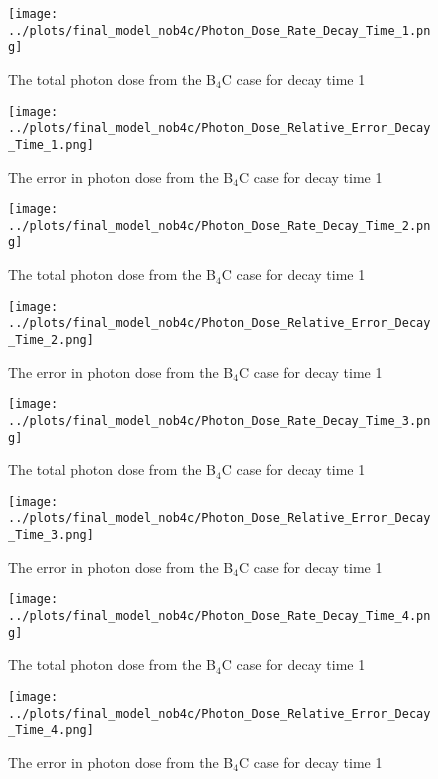\begin{figure}[ht!]
\centering
\texttt{[image: ../plots/final\_model\_nob4c/Photon\_Dose\_Rate\_Decay\_Time\_1.png]}
\label{fig:photons_dc1_no4bc_flux}
\caption{The total photon dose from the B$_4$C case for decay time 1}
\end{figure}
\begin{figure}[ht!]
\centering
\texttt{[image: ../plots/final\_model\_nob4c/Photon\_Dose\_Relative\_Error\_Decay\_Time\_1.png]}
\label{fig:photons_dc1_no4bc_error}
\caption{The error in photon dose from the B$_4$C case for decay time 1}
\end{figure}
\begin{figure}[ht!]
\centering
\texttt{[image: ../plots/final\_model\_nob4c/Photon\_Dose\_Rate\_Decay\_Time\_2.png]}
\label{fig:photons_dc1_no4bc_flux}
\caption{The total photon dose from the B$_4$C case for decay time 1}
\end{figure}
\begin{figure}[ht!]
\centering
\texttt{[image: ../plots/final\_model\_nob4c/Photon\_Dose\_Relative\_Error\_Decay\_Time\_2.png]}
\label{fig:photons_dc1_no4bc_error}
\caption{The error in photon dose from the B$_4$C case for decay time 1}
\end{figure}
\begin{figure}[ht!]
\centering
\texttt{[image: ../plots/final\_model\_nob4c/Photon\_Dose\_Rate\_Decay\_Time\_3.png]}
\label{fig:photons_dc1_no4bc_flux}
\caption{The total photon dose from the B$_4$C case for decay time 1}
\end{figure}
\begin{figure}[ht!]
\centering
\texttt{[image: ../plots/final\_model\_nob4c/Photon\_Dose\_Relative\_Error\_Decay\_Time\_3.png]}
\label{fig:photons_dc1_no4bc_error}
\caption{The error in photon dose from the B$_4$C case for decay time 1}
\end{figure}
\begin{figure}[ht!]
\centering
\texttt{[image: ../plots/final\_model\_nob4c/Photon\_Dose\_Rate\_Decay\_Time\_4.png]}
\label{fig:photons_dc1_no4bc_flux}
\caption{The total photon dose from the B$_4$C case for decay time 1}
\end{figure}
\begin{figure}[ht!]
\centering
\texttt{[image: ../plots/final\_model\_nob4c/Photon\_Dose\_Relative\_Error\_Decay\_Time\_4.png]}
\label{fig:photons_dc1_no4bc_error}
\caption{The error in photon dose from the B$_4$C case for decay time 1}
\end{figure}
